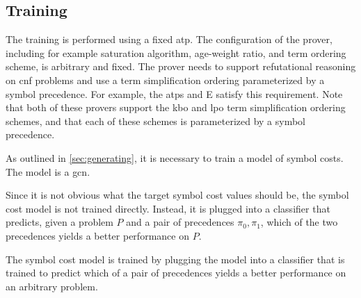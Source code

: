 \subsection{Training}

The training is performed using a fixed \acrlong{atp}.
The configuration of the prover,
including for example saturation algorithm, age-weight ratio, and term ordering scheme,
is arbitrary and fixed.
The prover needs to support refutational reasoning on \gls{cnf} problems
and use a term simplification ordering parameterized by a symbol precedence.
For example, the \glspl{atp} \vampire{} and E satisfy this requirement.
Note that both of these provers support the \gls{kbo} and \gls{lpo} term simplification ordering schemes,
and that each of these schemes is parameterized by a symbol precedence.

As outlined in \cref{sec:generating},
it is necessary to train a model of symbol costs.
The model is a \gls{gcn}.


Since it is not obvious what the target symbol cost values should be,
the symbol cost model is not trained directly.
Instead, it is plugged into a classifier that predicts,
given a problem $P$ and a pair of precedences $\pi_0, \pi_1$,
which of the two precedences yields a better performance on $P$.

The symbol cost model is trained by plugging the model into a classifier
that is trained to predict which of a pair of precedences
yields a better performance on an arbitrary problem.

